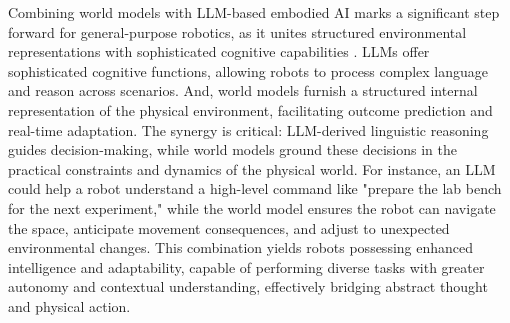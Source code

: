 Combining world models with LLM-based embodied AI marks a significant step forward for general-purpose robotics, as it unites structured environmental representations with sophisticated cognitive capabilities \cite{aljalbout2024limt}. LLMs offer sophisticated cognitive functions, allowing robots to process complex language and reason across scenarios. And, world models furnish a structured internal representation of the physical environment, facilitating outcome prediction and real-time adaptation. The synergy is critical: LLM-derived linguistic reasoning guides decision-making, while world models ground these decisions in the practical constraints and dynamics of the physical world. For instance, an LLM could help a robot understand a high-level command like "prepare the lab bench for the next experiment," while the world model ensures the robot can navigate the space, anticipate movement consequences, and adjust to unexpected environmental changes. This combination yields robots possessing enhanced intelligence and adaptability, capable of performing diverse tasks with greater autonomy and contextual understanding, effectively bridging abstract thought and physical action.


